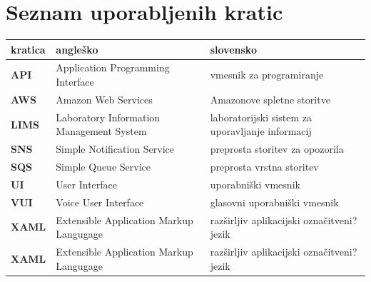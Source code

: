 \documentclass[a4paper, 12pt]{book}
\newcommand{\clearemptydoublepage}{\newpage{\pagestyle{empty}\cleardoublepage}}
\begin{document}
\clearemptydoublepage


\pagestyle{empty}
\def\thepage{}%
\tableofcontents{}


\clearemptydoublepage


\chapter*{Seznam uporabljenih kratic}  %


\noindent\begin{tabular}{p{}|p{}|p{}}    %
  {\bf kratica} & {\bf angleško}                             & {\bf slovensko} \\ \hline
  {\bf API} & Application Programming Interface & vmesnik za programiranje \\
  {\bf AWS} & Amazon Web Services & Amazonove spletne storitve \\
  {\bf LIMS} & Laboratory Information Management System & laboratorijski sistem za uporavljanje informacij \\
  {\bf SNS} & Simple Notification Service & preprosta storitev za opozorila \\
  {\bf SQS} & Simple Queue Service & preprosta vrstna storitev \\
  {\bf UI} & User Interface & uporabniški vmesnik \\
  {\bf VUI} & Voice User Interface & glasovni uporabniški vmesnik \\
  {\bf XAML} & Extensible Application Markup Langugage & razširljiv aplikacijski označitveni? jezik \\
  {\bf XAML} & Extensible Application Markup Langugage & razširljiv aplikacijski označitveni? jezik \\
\end{tabular}
\end{document}
